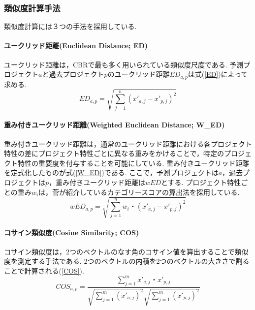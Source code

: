 \subsubsection{類似度計算手法}\label{Distance}
類似度計算には３つの手法を採用している.
\paragraph{ユークリッド距離(Euclidean Distance; ED) \quad \\}
ユークリッド距離\cite{Dejaeger2012}\cite{Shepperd1997}は，CBRで最も多く用いられている類似度尺度である.
予測プロジェクト$a$と過去プロジェクト$p$のユークリッド距離$ED_{a,p}$は式(\ref{ED})によって求める.
\begin{equation}
  \label{ED}
  ED_{a,p} = \sqrt{\sum_{j=1}^{n}(x'_{a,j} - x'_{p,j})^2}
\end{equation}
\paragraph{重み付きユークリッド距離(Weighted Euclidean Distance; W\_ED) \quad \\}
重み付きユークリッド距離は，通常のユークリッド距離における各プロジェクト特性の差にプロジェクト特性ごとに異なる重みをかけることで，特定のプロジェクト特性の重要度を付与することを可能にしている.
重み付きユークリッド距離を定式化したものが式(\ref{W_ED})である.
ここで，予測プロジェクトは$a$，過去プロジェクトは$p$，重み付きユークリッド距離は$wED$とする.
プロジェクト特性ごとの重み$w_i$は，菅\cite{菅2017}が紹介しているカテゴリースコアの算出法を採用している.
\begin{equation}
  \label{W_ED}
  wED_{a,p} = \sqrt{\sum_{j=1}^{n}w_i・(x'_{a,j} - x'_{p,j})^2}
\end{equation}
\paragraph{コサイン類似度(Cosine Similarity; COS) \quad \\}
コサイン類似度は，2つのベクトルのなす角のコサイン値を算出することで類似度を測定する手法である.
2つのベクトルの内積を2つのベクトルの大きさで割ることで計算される(\ref{COS}).
\begin{equation}
  \label{COS}
  COS_{a,p}=\frac{\sum_{j=1}^{m}x'_{a,j}・x'_{p,j}}{\sqrt{\sum_{j=1}^{m}(x'_{a,j})^2}\sqrt{\sum_{j=1}^{m}(x'_{p,j})^2}}
\end{equation}
